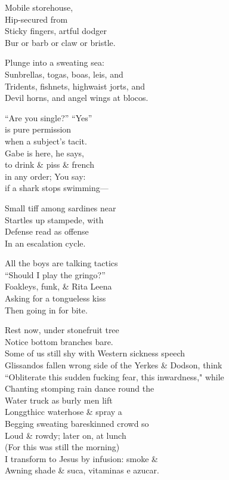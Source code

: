 Mobile storehouse, \\
Hip-secured from \\
Sticky fingers, artful dodger \\
Bur or barb or claw or bristle.

Plunge into a sweating sea: \\
Sunbrellas, togas, boas, leis, and \\
Tridents, fishnets, highwaist jorts, and \\
Devil horns, and angel wings at blocos. 

“Are you single?” “Yes” \\
is pure permission \\
when a subject's tacit. \\
Gabe is here, he says, \\
to drink \& piss \& french \\
in any order; You say: \\
if a shark stops swimming— 

Small tiff among sardines near \\
Startles up stampede, with \\
Defense read as offense \\
In an escalation cycle. 

All the boys are talking tactics \\
“Should I play the gringo?” \\
Foakleys, funk, \& Rita Leena \\
Asking for a tongueless kiss \\
Then going in for bite. 

Rest now, under stonefruit tree \\
Notice bottom branches bare. \\

Some of us still shy with Western sickness speech \\
Glissandos fallen wrong side of the Yerkes \& Dodson, think \\
“Obliterate this sudden fucking fear, this inwardness," while \\
Chanting stomping rain dance round the \\
Water truck as burly men lift \\
Longgthicc waterhose \& spray a \\
Begging sweating bareskinned crowd so \\
Loud \& rowdy; later on, at lunch \\
(For this was still the morning) \\
I transform to Jesus by infusion: smoke \& \\
Awning shade \& suca, vitaminas e azucar. 
